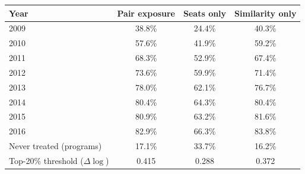 \begin{tabular}{lccc}
\toprule
Year & Pair exposure & Seats only & Similarity only \\
\midrule
2009 & 38.8\% & 24.4\% & 40.3\% \\
2010 & 57.6\% & 41.9\% & 59.2\% \\
2011 & 68.3\% & 52.9\% & 67.4\% \\
2012 & 73.6\% & 59.9\% & 71.4\% \\
2013 & 78.0\% & 62.1\% & 76.7\% \\
2014 & 80.4\% & 64.3\% & 80.4\% \\
2015 & 80.9\% & 63.2\% & 81.6\% \\
2016 & 82.9\% & 66.3\% & 83.8\% \\
\midrule
Never treated (programs) & 17.1\% & 33.7\% & 16.2\% \\
Top-20\% threshold (\(\Delta\log\)) & 0.415 & 0.288 & 0.372 \\
\bottomrule
\end{tabular}
